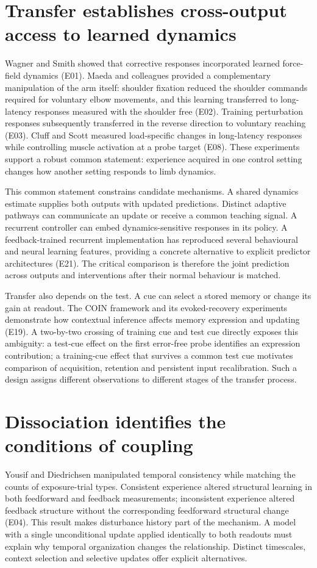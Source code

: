 \documentclass[11pt,a4paper]{article}
\begin{document}
\section{Transfer establishes cross-output access to learned dynamics}
Wagner and Smith showed that corrective responses incorporated learned force-field dynamics (E01). Maeda and colleagues provided a complementary manipulation of the arm itself: shoulder fixation reduced the shoulder commands required for voluntary elbow movements, and this learning transferred to long-latency responses measured with the shoulder free (E02). Training perturbation responses subsequently transferred in the reverse direction to voluntary reaching (E03). Cluff and Scott measured load-specific changes in long-latency responses while controlling muscle activation at a probe target (E08). These experiments support a robust common statement: experience acquired in one control setting changes how another setting responds to limb dynamics. \cite{wagner2008,maeda2018,maeda2020,cluff2013}

This common statement constrains candidate mechanisms. A shared dynamics estimate supplies both outputs with updated predictions. Distinct adaptive pathways can communicate an update or receive a common teaching signal. A recurrent controller can embed dynamics-sensitive responses in its policy. A feedback-trained recurrent implementation has reproduced several behavioural and neural learning features, providing a concrete alternative to explicit predictor architectures (E21). The critical comparison is therefore the joint prediction across outputs and interventions after their normal behaviour is matched. \cite{feulner2025}

Transfer also depends on the test. A cue can select a stored memory or change its gain at readout. The COIN framework and its evoked-recovery experiments demonstrate how contextual inference affects memory expression and updating (E19). A two-by-two crossing of training cue and test cue directly exposes this ambiguity: a test-cue effect on the first error-free probe identifies an expression contribution; a training-cue effect that survives a common test cue motivates comparison of acquisition, retention and persistent input recalibration. Such a design assigns different observations to different stages of the transfer process. \cite{coin2021}

\section{Dissociation identifies the conditions of coupling}
Yousif and Diedrichsen manipulated temporal consistency while matching the counts of exposure-trial types. Consistent experience altered structural learning in both feedforward and feedback measurements; inconsistent experience altered feedback structure without the corresponding feedforward structural change (E04). This result makes disturbance history part of the mechanism. A model with a single unconditional update applied identically to both readouts must explain why temporal organization changes the relationship. Distinct timescales, context selection and selective updates offer explicit alternatives. \cite{yousif2012}
\end{document}
